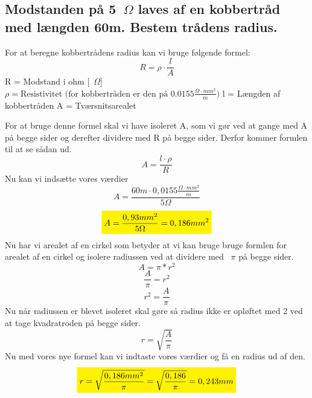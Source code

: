 \subsection{Modstanden på 5~$\Omega$ laves af en kobbertråd med længden 60m. Bestem trådens radius.}
For at beregne kobbertrådens radius kan vi bruge følgende formel:
\begin{equation*}
    R=\rho\cdot\frac{l}{A}
\end{equation*}
R = Modstand i ohm [~$\Omega$]\newline
\begin{math}
    \rho = \text{Resistivitet (for kobbertråden er den på } 0.0155 \frac{\Omega \cdot mm^{2}}{m})
\end{math}\newline
l = Længden af kobbertråden\newline
A = Tværsnitsarealet\newline

For at bruge denne formel skal vi have isoleret A, som vi gør ved at gange med A på begge sider og derefter dividere med R på begge sider. Derfor kommer formlen til at se sådan ud.
\begin{equation*}
    A=\frac{l\cdot\rho}{R}
\end{equation*}
Nu kan vi indsætte vores værdier
\begin{equation*}
    A=\frac{60m\cdot0,0155\frac{\Omega\cdot mm^{2}}{m}}{5\Omega}
\end{equation*}
\begin{equation*}
    \mathcolorbox{yellow}{A=\frac{0,93mm^{2}}{5\Omega}=0,186mm^{2}}
\end{equation*}
Nu har vi arealet af en cirkel som betyder at vi kan bruge bruge formlen for arealet af en cirkel og isolere radiussen ved at dividere med ~$\pi$ på begge sider.
\begin{equation*}
    A=\pi*r^{2}
\end{equation*}
\begin{equation*}
    \frac{A}{\pi}=r^{2}
\end{equation*}
\begin{equation*}
    r^{2}=\frac{A}{\pi}
\end{equation*}
Nu når radiussen er blevet isoleret skal gøre så radius ikke er opløftet med 2 ved at tage kvadratroden på begge sider.
\begin{equation*}
    r=\sqrt{\frac{A}{\pi}}
\end{equation*}
Nu med vores nye formel kan vi indtaste vores værdier og få en radius ud af den.
\begin{equation*}
    \mathcolorbox{yellow}{r=\sqrt{\frac{0,186mm^{2}}{\pi}} = \sqrt{\frac{0,186}{\pi}} = 0,243mm}
\end{equation*}
\newpage
